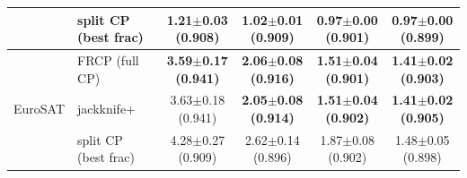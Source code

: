 \begin{table}[t]
\begin{tabular}{llcccc}
 & split CP (best frac) & \textbf{1.21$\pm$0.03 {\scriptsize(0.908)}} & 1.02$\pm$0.01 {\scriptsize(0.909)} & \textbf{0.97$\pm$0.00 {\scriptsize(0.901)}} & \textbf{0.97$\pm$0.00 {\scriptsize(0.899)}}\\
\midrule
\multirow{3}{*}{EuroSAT} & FRCP (full CP) & \textbf{3.59$\pm$0.17 {\scriptsize(0.941)}} & \textbf{2.06$\pm$0.08 {\scriptsize(0.916)}} & \textbf{1.51$\pm$0.04 {\scriptsize(0.901)}} & \textbf{1.41$\pm$0.02 {\scriptsize(0.903)}}\\
 & jackknife+ & 3.63$\pm$0.18 {\scriptsize(0.941)} & \textbf{2.05$\pm$0.08 {\scriptsize(0.914)}} & \textbf{1.51$\pm$0.04 {\scriptsize(0.902)}} & \textbf{1.41$\pm$0.02 {\scriptsize(0.905)}}\\
 & split CP (best frac) & 4.28$\pm$0.27 {\scriptsize(0.909)} & 2.62$\pm$0.14 {\scriptsize(0.896)} & 1.87$\pm$0.08 {\scriptsize(0.902)} & 1.48$\pm$0.05 {\scriptsize(0.898)}\\
\bottomrule
\end{tabular}
\end{table}
